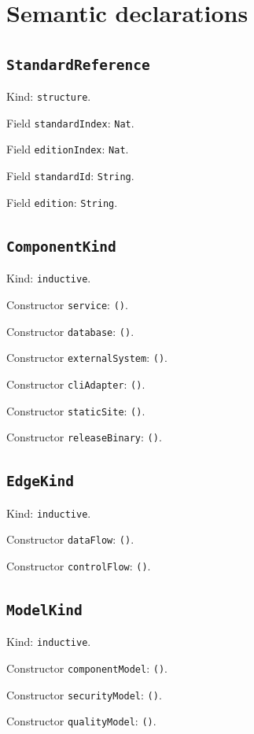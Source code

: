 \documentclass[11pt]{article}
\begin{document}
\section*{Semantic declarations}
\subsection*{\texttt{StandardReference}}
\noindent Kind: \texttt{structure}.\par
\noindent Field \texttt{standardIndex}: \texttt{Nat}.\par
\noindent Field \texttt{editionIndex}: \texttt{Nat}.\par
\noindent Field \texttt{standardId}: \texttt{String}.\par
\noindent Field \texttt{edition}: \texttt{String}.\par
\subsection*{\texttt{ComponentKind}}
\noindent Kind: \texttt{inductive}.\par
\noindent Constructor \texttt{service}: \texttt{()}.\par
\noindent Constructor \texttt{database}: \texttt{()}.\par
\noindent Constructor \texttt{externalSystem}: \texttt{()}.\par
\noindent Constructor \texttt{cliAdapter}: \texttt{()}.\par
\noindent Constructor \texttt{staticSite}: \texttt{()}.\par
\noindent Constructor \texttt{releaseBinary}: \texttt{()}.\par
\subsection*{\texttt{EdgeKind}}
\noindent Kind: \texttt{inductive}.\par
\noindent Constructor \texttt{dataFlow}: \texttt{()}.\par
\noindent Constructor \texttt{controlFlow}: \texttt{()}.\par
\subsection*{\texttt{ModelKind}}
\noindent Kind: \texttt{inductive}.\par
\noindent Constructor \texttt{componentModel}: \texttt{()}.\par
\noindent Constructor \texttt{securityModel}: \texttt{()}.\par
\noindent Constructor \texttt{qualityModel}: \texttt{()}.\par
\end{document}
